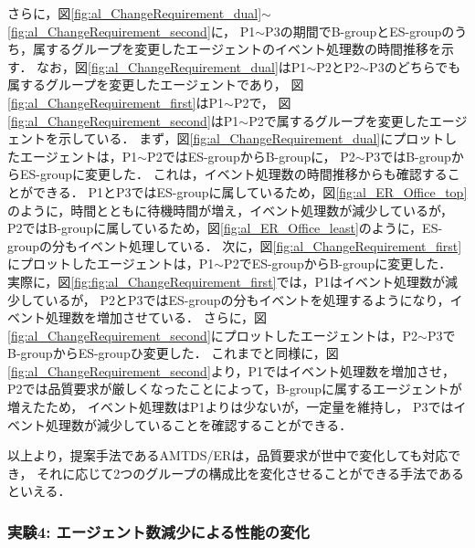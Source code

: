 \documentclass[12pt,a4j,twoside]{jarticle}
\begin{document}
  さらに，図\ref{fig:al_ChangeRequirement_dual}$\sim$\ref{fig:al_ChangeRequirement_second}に，
  P1$\sim$P3の期間でB-groupとES-groupのうち，属するグループを変更したエージェントのイベント処理数の時間推移を示す．
  なお，図\ref{fig:al_ChangeRequirement_dual}はP1$\sim$P2とP2$\sim$P3のどちらでも属するグループを変更したエージェントであり，
  図\ref{fig:al_ChangeRequirement_first}はP1$\sim$P2で，
  図\ref{fig:al_ChangeRequirement_second}はP1$\sim$P2で属するグループを変更したエージェントを示している．
  まず，図\ref{fig:al_ChangeRequirement_dual}にプロットしたエージェントは，P1$\sim$P2ではES-groupからB-groupに，
  P2$\sim$P3ではB-groupからES-groupに変更した．
  これは，イベント処理数の時間推移からも確認することができる．
  P1とP3ではES-groupに属しているため，図\ref{fig:al_ER_Office_top}のように，時間とともに待機時間が増え，イベント処理数が減少しているが，
  P2ではB-groupに属しているため，図\ref{fig:al_ER_Office_least}のように，ES-groupの分もイベント処理している．
  次に，図\ref{fig:al_ChangeRequirement_first}にプロットしたエージェントは，P1$\sim$P2でES-groupからB-groupに変更した．
  実際に，図\ref{fig:fig:al_ChangeRequirement_first}では，P1はイベント処理数が減少しているが，
  P2とP3ではES-groupの分もイベントを処理するようになり，イベント処理数を増加させている．
  さらに，図\ref{fig:al_ChangeRequirement_second}にプロットしたエージェントは，P2$\sim$P3でB-groupからES-groupひ変更した．
  これまでと同様に，図\ref{fig:al_ChangeRequirement_second}より，P1ではイベント処理数を増加させ，
  P2では品質要求が厳しくなったことによって，B-groupに属するエージェントが増えたため，
  イベント処理数はP1よりは少ないが，一定量を維持し，
  P3ではイベント処理数が減少していることを確認することができる．
  \par

  以上より，提案手法であるAMTDS/ERは，品質要求が世中で変化しても対応でき，
  それに応じて2つのグループの構成比を変化させることができる手法であるといえる．
  


  \subsubsection{実験4: エージェント数減少による性能の変化}\label{ex:ER4}
\end{document}

